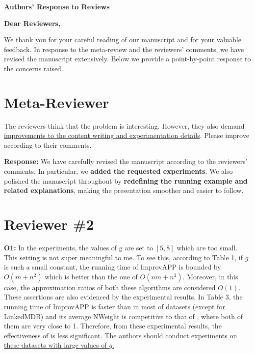 \thispagestyle{plain}

\begin{center}
    {\LARGE\bfseries Authors' Response to Reviews\par}
    \vspace{1em}
\end{center}

\noindent\textbf{Dear Reviewers,}

\noindent We thank you for your careful reading of our manuscript and for your valuable feedback. In response to the meta-review and the reviewers' comments, we have revised the manuscript extensively. Below we provide a point-by-point response to the concerns raised.

\section*{Meta-Reviewer}
The reviewers think that the problem is interesting. However, they also demand \uline{improvements to the content writing and experimentation details}. Please improve according to their comments.

\textbf{Response:} We have carefully revised the manuscript according to the reviewers' comments. In particular, we \textbf{added the requested experiments}. We also polished the manuscript throughout by \textbf{redefining the running example and related explanations}, making the presentation smoother and easier to follow.

\section*{Reviewer \#2}

\textbf{O1:} In the experiments, the values of g are set to $[5, 8]$ which are too small. This setting is not super meaningful to me. To see this, according to Table 1, if $g$ is such a small constant, the running time of ImprovAPP is bounded by $O(m + n^2)$ which is better than the one of \Improved $O(nm + n^2)$. Moreover, in this case, the approximation ratios of both these algorithms are considered $O(1)$. These assertions are also evidenced by the experimental results. In Table 3, the running time of ImprovAPP is faster than \Improved in most of datasets (except for LinkedMDB) and its average NWeight is competitive to that of \Improved, where both of them are very close to 1. Therefore, from these experimental results, the effectiveness of \Improved is less significant. \uline{The authors should conduct experiments on these datasets with large values of $g$.}

